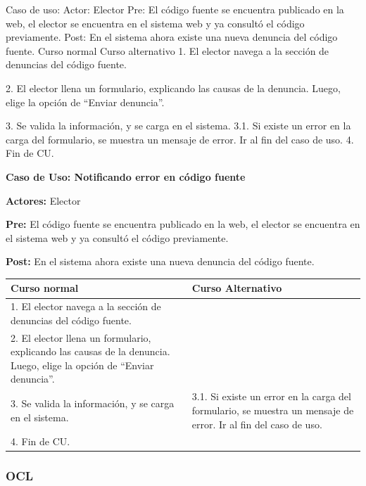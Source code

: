 Caso de uso: 
Actor: Elector
Pre: El código fuente se encuentra publicado en la web, el elector se encuentra en el sistema web y ya consultó el código previamente.
Post: En el sistema ahora existe una nueva denuncia del código fuente.
Curso normal
Curso alternativo
1. El elector navega a la sección de denuncias del código fuente. 


2. El elector llena un formulario, explicando las causas de la denuncia. Luego, elige la opción de “Enviar denuncia”.


3. Se valida la información, y se carga en el sistema.
3.1. Si existe un error en la carga del formulario, se muestra un mensaje de error. Ir al fin del caso de uso.
4. Fin de CU.


\textbf{Caso de Uso: Notificando error en código fuente}

\textbf{Actores:}  Elector

\textbf{Pre:} El código fuente se encuentra publicado en la web, el elector se encuentra en el sistema web y ya consultó el código previamente.

\textbf{Post:} En el sistema ahora existe una nueva denuncia del código fuente.
\begin{table}[h!]
	
 \begin{tabular}{|p{7.5cm} | p{7.5cm}|} 
 \hline
 \textbf{Curso normal} & \textbf{Curso Alternativo} \\
 \hline
1. El elector navega a la sección de denuncias del código fuente. & \\
\hline


2. El elector llena un formulario, explicando las causas de la denuncia. Luego, elige la opción de “Enviar denuncia”. & \\
\hline


3. Se valida la información, y se carga en el sistema. & 3.1. Si existe un error en la carga del formulario, se muestra un mensaje de error. Ir al fin del caso de uso. \\
\hline
4. Fin de CU.& \\
\hline
 \end{tabular}

\end{table}






\subsubsection{OCL}





